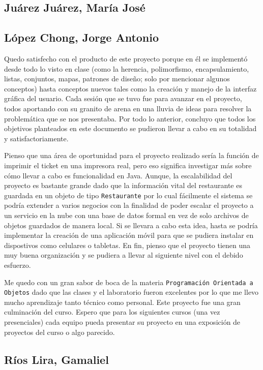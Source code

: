 \subsection*{Juárez Juárez, María José}

\subsection*{López Chong, Jorge Antonio}
Quedo satisfecho con el producto de este proyecto porque en él se implementó desde todo lo visto en clase
(como la herencia, polimorfismo, encapsulamiento, listas, conjuntos, mapas, patrones de diseño; solo por
mencionar algunos conceptos) hasta conceptos nuevos tales como la creación y manejo de la interfaz
gráfica del usuario. Cada sesión que se tuvo fue para avanzar en el proyecto, todos aportando con su granito
de arena en una lluvia de ideas para resolver la problemática que se nos presentaba. Por todo lo anterior,
concluyo que todos los objetivos planteados en este documento se pudieron llevar a cabo en su totalidad y
satisfactoriamente.

Pienso que una área de oportunidad para el proyecto realizado sería la función de imprimir el ticket en una
impresora real, pero eso significa investigar más sobre cómo llevar a cabo es funcionalidad en Java. Aunque,
la escalabilidad del proyecto es bastante grande dado que la información vital del restaurante es guardada
en un objeto de tipo \texttt{Restaurante} por lo cual fácilmente el sistema se podría extender a varios
negocios con la finalidad de poder escalar el proyecto a un servicio en la nube con una base de datos formal
en vez de solo archivos de objetos guardados de manera local. Si se llevara a cabo esta idea, hasta se podría
implementar la creación de una aplicación móvil para que se pudiera instalar en dispostivos como celulares o
tabletas. En fin, pienso que el proyecto tienen una muy buena organización y se pudiera a llevar al siguiente
nivel con el debido esfuerzo.

Me quedo con un gran sabor de boca de la materia \texttt{Programación Orientada a Objetos} dado que las clases
y el laboratorio fueron excelentes por lo que me llevo mucho aprendizaje tanto técnico como personal. Este proyecto
fue una gran culminación del curso. Espero que para los siguientes cursos (una vez presenciales) cada equipo
pueda presentar su proyecto en una exposición de proyectos del curso o algo parecido.

\subsection*{Ríos Lira, Gamaliel}
